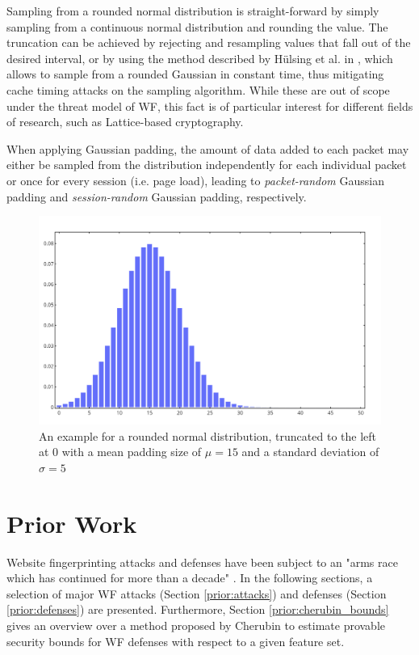 \documentclass[
	ruledheaders=chapter,
	class=report,
	thesis={type=master, department=inf},
	accentcolor=1c,
	custommargins=true,
	marginpar=false,
	parskip=half-,
	fontsize=11pt,
]{tudapub}
\begin{document}
	Sampling from a rounded normal distribution is straight-forward by simply sampling from a continuous normal distribution and rounding the value. The truncation can be achieved by rejecting and resampling values that fall out of the desired interval, or by using the method described by Hülsing et al. in \cite{Huelsing2018}, which allows to sample from a rounded Gaussian in constant time, thus mitigating cache timing attacks on the sampling algorithm. While these are out of scope under the threat model of WF, this fact is of particular interest for different fields of research, such as Lattice-based cryptography. \cite{Huelsing2018}
	
	When applying Gaussian padding, the amount of data added to each packet may either be sampled from the distribution independently for each individual packet or once for every session (i.e. page load), leading to \textit{packet-random} Gaussian padding and \textit{session-random} Gaussian padding, respectively.
	
	\begin{figure}[tb]
		\centering
		\includegraphics[width=\textwidth]{truncated_rounded_normal.png}
		\caption{An example for a rounded normal distribution, truncated to the left at 0 with a mean padding size of $\mu = 15$ and a standard deviation of $\sigma = 5$ }
		\label{fig:trunc_gauss}
	\end{figure}

	\chapter{Prior Work}
	\label{prior}
	
	Website fingerprinting attacks and defenses have been subject to an "arms race which has continued for more than a decade" \cite{Cherubin2017}. In the following sections, a selection of major WF attacks (Section \ref{prior:attacks}) and defenses (Section \ref{prior:defenses}) are presented. Furthermore, Section \ref{prior:cherubin_bounds} gives an overview over a method proposed by Cherubin \cite{Cherubin2017} to estimate provable security bounds for WF defenses with respect to a given feature set.
	
\end{document}
